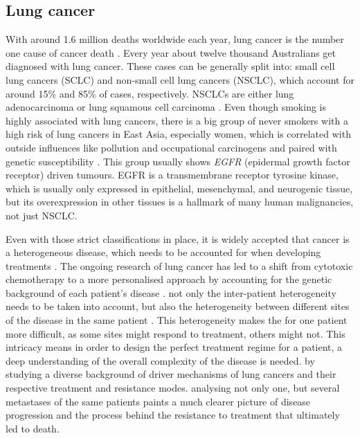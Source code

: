 \subsection{Lung cancer}
\label{intro-sec:lungcancer}

With around 1.6 million deaths worldwide each year, lung cancer is the number one cause of cancer death \cite{Siegel2018}. Every year about twelve thousand Australians get diagnosed with lung cancer. These cases can be generally split into: small cell lung cancers (SCLC) and non-small cell lung cancers (NSCLC), which account for around 15\% and 85\% of cases, respectively.  NSCLCs are either lung adenocarcinoma or lung squamous cell carcinoma \cite{Molina2008}. Even though smoking is highly associated with lung cancers, there is a big group of never smokers with a high risk of lung cancers in East Asia, especially women, which is correlated with outside influences like pollution and occupational carcinogens and paired with genetic susceptibility \cite{Sun2007}.
This group usually shows \textit{EGFR} (epidermal growth factor receptor) driven tumours. EGFR is a transmembrane receptor tyrosine kinase, which is usually only expressed in epithelial, mesenchymal, and neurogenic tissue, but its overexpression in other tissues is a hallmark of many human malignancies, not just NSCLC.

Even with those strict classifications in place, it is widely accepted that cancer is a heterogeneous disease, which needs to be accounted for when developing treatments \cite{Suda2018}. The ongoing research of lung cancer has led to a shift from cytotoxic chemotherapy to a more personalised approach by accounting for the genetic background of each patient’s disease \cite{Lindeman2018}. 
 not only the inter-patient heterogeneity needs to be taken into account, but also the heterogeneity between different sites of the disease in the same patient \cite{Leong2018,Savas2016}. This heterogeneity makes the  for one  patient more  difficult, as some sites might respond to treatment,  others might not. This intricacy means in order to design the perfect treatment regime for a patient, a deep understanding of the overall complexity of the disease is needed.  by studying a diverse background of driver mechanisms of lung cancers and their respective treatment and resistance modes.  analysing not only one, but several metastases of the same patients paints a much clearer picture of disease progression and the process behind the resistance to treatment that ultimately led to death. 


